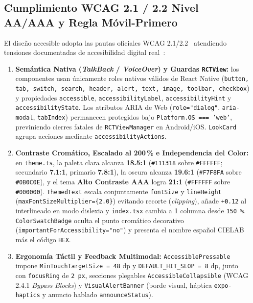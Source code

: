 \documentclass[conference]{IEEEtran}
\begin{document}
\subsection{Cumplimiento WCAG 2.1 / 2.2 Nivel AA/AAA y Regla Móvil-Primero}
El diseño accesible adopta las pautas oficiales WCAG 2.1/2.2~\cite{ref19} atendiendo tensiones documentadas de accesibilidad digital real~\cite{ref13}:
\begin{enumerate}
    \item \textbf{Semántica Nativa (\textit{TalkBack} / \textit{VoiceOver}) y Guardas \texttt{RCTView}:} los componentes usan únicamente roles nativos válidos de React Native (\texttt{button, tab, switch, search, header, alert, text, image, toolbar, checkbox}) y propiedades \texttt{accessible}, \texttt{accessibilityLabel}, \texttt{accessibilityHint} y \texttt{accessibilityState}. Los atributos ARIA de Web (\texttt{role="dialog"}, \texttt{aria-modal}, \texttt{tabIndex}) permanecen protegidos bajo \texttt{Platform.OS === 'web'}, previniendo cierres fatales de \texttt{RCTViewManager} en Android/iOS. \texttt{LookCard} agrupa acciones mediante \texttt{accessibilityActions}.
    \item \textbf{Contraste Cromático, Escalado al 200\,\% e Independencia del Color:} en \texttt{theme.ts}, la paleta clara alcanza \textbf{18.5:1} (\texttt{\#111318} sobre \texttt{\#FFFFFF}; secundario \textbf{7.1:1}, primario \textbf{7.8:1}), la oscura alcanza \textbf{19.6:1} (\texttt{\#F7F8FA} sobre \texttt{\#0B0C0E}), y el tema \textbf{Alto Contraste AAA} logra \textbf{21:1} (\texttt{\#FFFFFF} sobre \texttt{\#000000}). \texttt{ThemedText} escala conjuntamente \texttt{fontSize} y \texttt{lineHeight} (\texttt{maxFontSizeMultiplier=\{2.0\}}) evitando recorte (\textit{clipping}), añade \texttt{+0.12} al interlineado en modo dislexia y \texttt{index.tsx} cambia a 1 columna desde \texttt{150\,\%}. \texttt{ColorSwatchBadge} oculta el punto cromático decorativo (\texttt{importantForAccessibility="no"}) y presenta el nombre español CIELAB más el código \texttt{HEX}.
    \item \textbf{Ergonomía Táctil y Feedback Multimodal:} \texttt{AccessiblePressable} impone \texttt{MinTouchTargetSize = 48} dp y \texttt{DEFAULT\_HIT\_SLOP = 8} dp, junto con \texttt{focusRing} de \texttt{2 px}, secciones plegables \texttt{AccessibleCollapsible} (WCAG 2.4.1 \textit{Bypass Blocks}) y \texttt{VisualAlertBanner} (borde visual, háptica \texttt{expo-haptics} y anuncio hablado \texttt{announceStatus}).
\end{enumerate}
\end{document}
